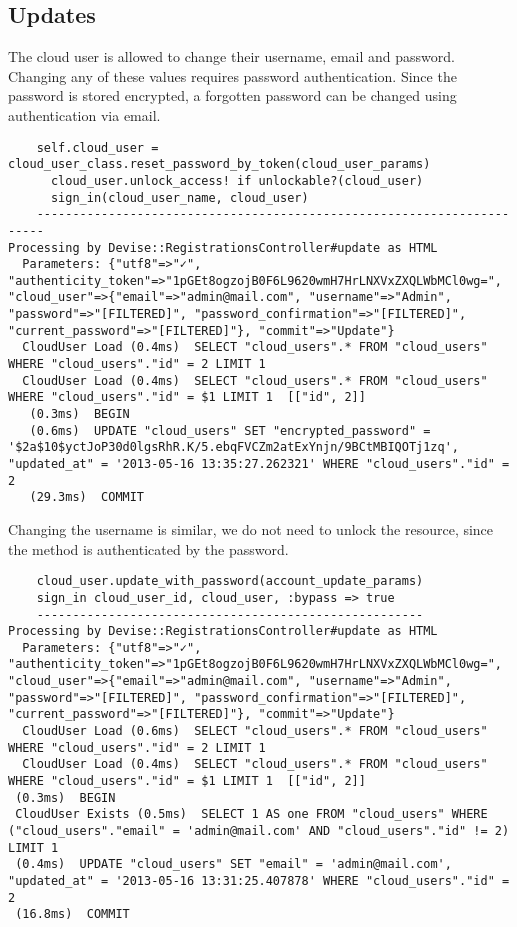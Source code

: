 \documentclass[12pt]{article}
\begin{document}
\subsection{Updates}
The cloud user is allowed to change their username, email and password. Changing any of these values requires password authentication. Since the password is stored encrypted, a forgotten password can be changed using authentication via email.
\begin{lstlisting}
    self.cloud_user = cloud_user_class.reset_password_by_token(cloud_user_params)
      cloud_user.unlock_access! if unlockable?(cloud_user)
      sign_in(cloud_user_name, cloud_user)
    -----------------------------------------------------------------------
Processing by Devise::RegistrationsController#update as HTML
  Parameters: {"utf8"=>"✓", "authenticity_token"=>"1pGEt8ogzojB0F6L9620wmH7HrLNXVxZXQLWbMCl0wg=", "cloud_user"=>{"email"=>"admin@mail.com", "username"=>"Admin", "password"=>"[FILTERED]", "password_confirmation"=>"[FILTERED]", "current_password"=>"[FILTERED]"}, "commit"=>"Update"}
  CloudUser Load (0.4ms)  SELECT "cloud_users".* FROM "cloud_users" WHERE "cloud_users"."id" = 2 LIMIT 1
  CloudUser Load (0.4ms)  SELECT "cloud_users".* FROM "cloud_users" WHERE "cloud_users"."id" = $1 LIMIT 1  [["id", 2]]
   (0.3ms)  BEGIN
   (0.6ms)  UPDATE "cloud_users" SET "encrypted_password" = '$2a$10$yctJoP30d0lgsRhR.K/5.ebqFVCZm2atExYnjn/9BCtMBIQOTj1zq', "updated_at" = '2013-05-16 13:35:27.262321' WHERE "cloud_users"."id" = 2
   (29.3ms)  COMMIT
\end{lstlisting}
Changing the username is similar, we do not need to unlock the resource, since the method is authenticated by the password.
\begin{lstlisting}
    cloud_user.update_with_password(account_update_params)
    sign_in cloud_user_id, cloud_user, :bypass => true
    ------------------------------------------------------
Processing by Devise::RegistrationsController#update as HTML
  Parameters: {"utf8"=>"✓", "authenticity_token"=>"1pGEt8ogzojB0F6L9620wmH7HrLNXVxZXQLWbMCl0wg=", "cloud_user"=>{"email"=>"admin@mail.com", "username"=>"Admin", "password"=>"[FILTERED]", "password_confirmation"=>"[FILTERED]", "current_password"=>"[FILTERED]"}, "commit"=>"Update"}
  CloudUser Load (0.6ms)  SELECT "cloud_users".* FROM "cloud_users" WHERE "cloud_users"."id" = 2 LIMIT 1
  CloudUser Load (0.4ms)  SELECT "cloud_users".* FROM "cloud_users" WHERE "cloud_users"."id" = $1 LIMIT 1  [["id", 2]]
 (0.3ms)  BEGIN
 CloudUser Exists (0.5ms)  SELECT 1 AS one FROM "cloud_users" WHERE ("cloud_users"."email" = 'admin@mail.com' AND "cloud_users"."id" != 2) LIMIT 1
 (0.4ms)  UPDATE "cloud_users" SET "email" = 'admin@mail.com', "updated_at" = '2013-05-16 13:31:25.407878' WHERE "cloud_users"."id" = 2
 (16.8ms)  COMMIT
\end{lstlisting}
\end{document}
